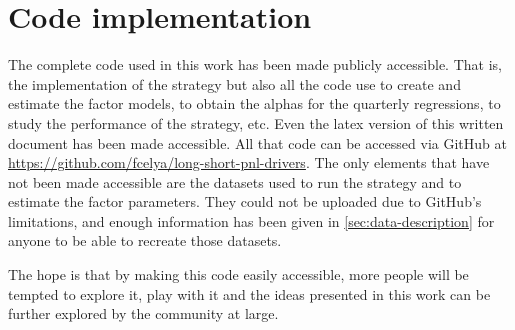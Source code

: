 \section{Code implementation}
\label{sec:code}
The complete code used in this work has been made publicly accessible. That is, the implementation of the strategy but also all the code use to create and estimate the factor models, to obtain the alphas for the quarterly regressions, to study the performance of the strategy, etc. Even the latex version of this written document has been made accessible. All that code can be accessed via GitHub at \href{https://github.com/fcelya/long-short-pnl-drivers}{https://github.com/fcelya/long-short-pnl-drivers}. The only elements that have not been made accessible are the datasets used to run the strategy and to estimate the factor parameters. They could not be uploaded due to GitHub's limitations, and enough information has been given in \autoref{sec:data-description} for anyone to be able to recreate those datasets. 

The hope is that by making this code easily accessible, more people will be tempted to explore it, play with it and the ideas presented in this work can be further explored by the community at large. 